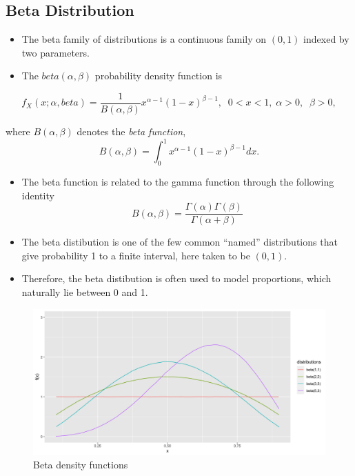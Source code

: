 \documentclass[]{book}
\begin{document}
\hypertarget{beta-distribution}{%
\subsection{Beta Distribution}\label{beta-distribution}}

\begin{itemize}
\item
  The beta family of distributions is a continuous family on \((0,1)\) indexed by two parameters.
\item
  The \(beta(\alpha, \beta)\) probability density function is
\end{itemize}

\[f_X(x; \alpha, beta)= \frac{1}{B(\alpha, \beta)}x^{\alpha -1}(1-x)^{\beta-1},\;\;0<x<1,\; \alpha >0,\;\; \beta >0,\]

where \(B(\alpha, \beta)\) denotes the \emph{beta function},
\[B(\alpha, \beta)=\int_0^1x^{\alpha -1}(1-x)^{\beta-1}dx.\]

\begin{itemize}
\item
  The beta function is related to the gamma function through the following identity \[B(\alpha, \beta)= \frac{\Gamma(\alpha)\Gamma(\beta)}{\Gamma(\alpha+\beta)}\]
\item
  The beta distibution is one of the few common ``named'' distributions that give probability 1 to a finite interval, here taken to be \((0,1)\).
\item
  Therefore, the beta distibution is often used to model proportions, which naturally lie between 0 and 1.
\end{itemize}

\begin{figure}

{\centering \includegraphics{figure/beta-1} 

}

\caption{Beta density functions}\label{fig:beta}
\end{figure}
\newpage
\end{document}
